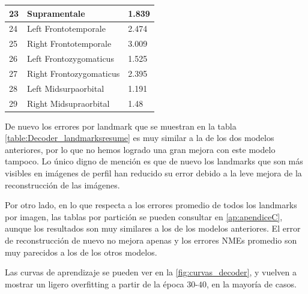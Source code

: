\begin{table}[!ht]
\begin{tabular}{|l|l|l|}
                    23 & Supramentale & 1.839 \\ \hline
                    24 & Left Frontotemporale & 2.474 \\ \hline
                    25 & Right Frontotemporale & 3.009 \\ \hline
                    26 & Left Frontozygomaticus & 1.525 \\ \hline
                    27 & Right Frontozygomaticus & 2.395 \\ \hline
                    28 & Left Midsurpaorbital & 1.191 \\ \hline
                    29 & Right Midsupraorbital & 1.48 \\ \hline
                \end{tabular}
                \label{table:Decoder_landmarksresume}
            \end{table}          
            
            \medskip 

            \noindent De nuevo los errores por landmark que se muestran en la tabla \autoref{table:Decoder_landmarksresume} es muy similar a la de los dos modelos anteriores, por lo que no hemos logrado una gran mejora con este modelo tampoco. Lo único digno de mención es que de nuevo los landmarks que son más visibles en imágenes de perfil han reducido su error debido a la leve mejora de la reconstrucción de las imágenes. 

            \medskip

            \noindent Por otro lado, en lo que respecta a los errores promedio de todos los landmarks por imagen, las tablas por partición se pueden consultar en \autoref{ap:apendiceC}, aunque los resultados son muy similares a los de los modelos anteriores. El error de reconstrucción de nuevo no mejora apenas y los errores NMEs promedio son muy parecidos a los de los otros modelos. 

            \medskip

            \noindent Las curvas de aprendizaje se pueden ver en la \autoref{fig:curvas_decoder}, y vuelven a mostrar un ligero overfitting a partir de la época $30$-$40$, en la mayoría de casos. 
            
